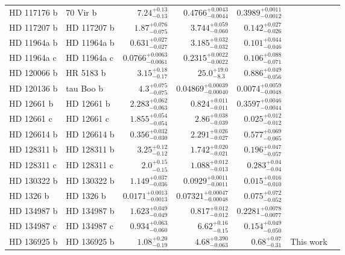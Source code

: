 \begin{longtable*}{llrrrrr}
HD 117176 b & 70 Vir b & $7.24^{+0.13}_{-0.13}$ & $0.4766^{+0.0043}_{-0.0044}$ & $0.3989^{+0.0011}_{-0.0012}$ & \cite{Naef04} & \\
HD 117207 b & HD 117207 b & $1.87^{+0.076}_{-0.075}$ & $3.744^{+0.059}_{-0.060}$ & $0.142^{+0.027}_{-0.026}$ & \cite{Marcy05} & \\
HD 11964a b & HD 11964a b & $0.631^{+0.027}_{-0.027}$ & $3.185^{+0.032}_{-0.032}$ & $0.101^{+0.044}_{-0.046}$ & \cite{Butler06} & \\
HD 11964a c & HD 11964a c & $0.0766^{+0.0063}_{-0.0061}$ & $0.2315^{+0.0022}_{-0.0022}$ & $0.106^{+0.088}_{-0.071}$ & \cite{Wright09} & \\
HD 120066 b & HR 5183 b & $3.15^{+0.18}_{-0.17}$ & $25.0^{+19.0}_{-8.3}$ & $0.886^{+0.049}_{-0.056}$ & \cite{Blunt19} & \\
HD 120136 b & tau Boo b & $4.3^{+0.075}_{-0.075}$ & $0.04869^{+0.00039}_{-0.00040}$ & $0.0074^{+0.0059}_{-0.0048}$ & \cite{Butler97} & \\
HD 12661 b & HD 12661 b & $2.283^{+0.062}_{-0.063}$ & $0.824^{+0.011}_{-0.011}$ & $0.3597^{+0.0046}_{-0.0044}$ & \cite{Fischer01} & \\
HD 12661 c & HD 12661 c & $1.855^{+0.054}_{-0.054}$ & $2.86^{+0.038}_{-0.039}$ & $0.025^{+0.012}_{-0.012}$ & \cite{Butler06} & \\
HD 126614 b & HD 126614 b & $0.356^{+0.032}_{-0.030}$ & $2.291^{+0.026}_{-0.027}$ & $0.577^{+0.069}_{-0.065}$ & \cite{Howard10} & \\
HD 128311 b & HD 128311 b & $3.25^{+0.12}_{-0.12}$ & $1.742^{+0.020}_{-0.021}$ & $0.196^{+0.047}_{-0.057}$ & \cite{Butler03} & \\
HD 128311 c & HD 128311 c & $2.0^{+0.15}_{-0.15}$ & $1.088^{+0.012}_{-0.013}$ & $0.283^{+0.04}_{-0.04}$ & \cite{Vogt05} & \\
HD 130322 b & HD 130322 b & $1.149^{+0.037}_{-0.036}$ & $0.0929^{+0.0011}_{-0.0011}$ & $0.015^{+0.016}_{-0.010}$ & \cite{Udry00} & \\
HD 1326 b & HD 1326 b & $0.0171^{+0.0013}_{-0.0013}$ & $0.07321^{+0.00047}_{-0.00048}$ & $0.075^{+0.072}_{-0.052}$ & \cite{Howard14} & \\
HD 134987 b & HD 134987 b & $1.623^{+0.049}_{-0.049}$ & $0.817^{+0.012}_{-0.012}$ & $0.2281^{+0.0078}_{-0.0077}$ & \cite{Butler01} & \\
HD 134987 c & HD 134987 c & $0.934^{+0.063}_{-0.060}$ & $6.62^{+0.16}_{-0.15}$ & $0.154^{+0.049}_{-0.050}$ & \cite{Jones10} & \\
HD 136925 b & HD 136925 b & $1.08^{+0.20}_{-0.19}$ & $4.68^{+0.390}_{-0.063}$ & $0.68^{+0.07}_{-0.31}$ & This work & \\

\end{longtable*}
